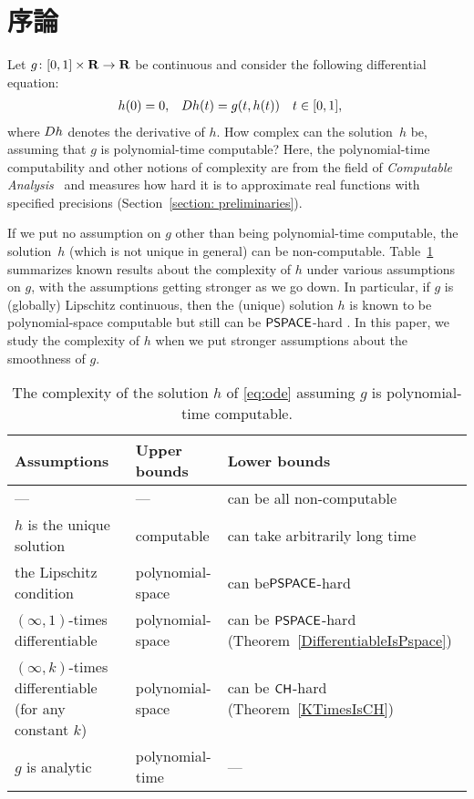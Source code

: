 \section{序論}

Let $g \colon [0,1] \times \mathbf R \to \mathbf R$ be continuous 
and consider the following differential equation: 
\begin{align}
 \label{eq:ode}
 h(0) & = 0, &
 D h(t) & = g(t,h(t)) \quad t \in [0,1], 
\end{align}
where $D h$ denotes the derivative of $h$. 
How complex can the solution~$h$ be, 
assuming that $g$ is polynomial-time computable? 
Here, the polynomial-time computability 
and other notions of complexity 
are from the field of 
\emph{Computable Analysis}~\cite{weihrauch00:_comput_analy}
and measures how hard it is to 
approximate real functions with specified precisions 
(Section~\ref{section: preliminaries}). 

If we put no assumption on $g$ other than being polynomial-time computable, 
the solution~$h$ (which is not unique in general) can be non-computable. 
Table~\ref{table:related} summarizes known results about 
the complexity of $h$ under various assumptions on $g$, 
with the assumptions getting stronger as we go down. 
In particular, if $g$ is (globally) Lipschitz continuous, 
then the (unique) solution $h$ is known to be 
polynomial-space computable but still can be 
$\mathsf{PSPACE}$-hard \cite{kawamura2010lipschitz}. 
In this paper, we study the complexity of $h$ 
when we put stronger assumptions about 
the smoothness of $g$. 

\begin{table}
\renewcommand\arraystretch{1.3}
\begin{center}
 \caption{The complexity of the solution $h$ of \eqref{eq:ode}
 assuming $g$ is polynomial-time computable.}
 \label{table:related}
 \begin{tabular}{lll}
  Assumptions & Upper bounds & Lower bounds \\
  \hline
   --- & --- & can be all non-computable \cite{pour1979computable} \\
  $h$ is the unique solution & computable \cite{coddington1955theory}
  & can take arbitrarily long time \cite{ko1983computational, miller1970recursive} \\
  the Lipschitz condition  & polynomial-space \cite{ko1983computational}
      &	can be$\mathsf{PSPACE}$-hard \cite{kawamura2010lipschitz}\\
  $(\infty, 1)$-times differentiable & polynomial-space 
      & \parbox[t]{14zw}{can be $\mathsf{PSPACE}$-hard\\{}(Theorem~\ref{DifferentiableIsPspace})} \\
  \parbox[t]{14zw}{$(\infty, k)$-times differentiable\\{}(for any constant $k$)}
  & polynomial-space & \parbox[t]{14zw}{can be $\mathsf{CH}$-hard\\{}(Theorem~\ref{KTimesIsCH})} \\
  $g$ is analytic
  & polynomial-time \cite{muller1987uniform, ko1988computing, kawamura2010complexity} 
  & ---
 \end{tabular}
\end{center}
\end{table}

